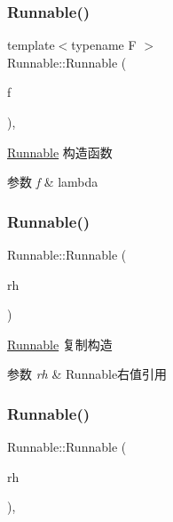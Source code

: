 \subsubsection{\texorpdfstring{Runnable()}{Runnable()}\hspace{0.1cm}{\footnotesize\ttfamily [1/3]}}
{\footnotesize\ttfamily template$<$typename F $>$ \\
Runnable\+::\+Runnable (\begin{DoxyParamCaption}\item[{F \&\&}]{f }\end{DoxyParamCaption})\hspace{0.3cm}{\ttfamily [inline]}, {\ttfamily [explicit]}}



\hyperlink{classRunnable}{Runnable} 构造函数 


\begin{DoxyParams}{参数}
{\em f} & lambda \\
\hline
\end{DoxyParams}
\mbox{\label{classRunnable_a6d6ce997a7873530a2f339412e6c4935}} 
\subsubsection{\texorpdfstring{Runnable()}{Runnable()}\hspace{0.1cm}{\footnotesize\ttfamily [2/3]}}
{\footnotesize\ttfamily Runnable\+::\+Runnable (\begin{DoxyParamCaption}\item[{\hyperlink{classRunnable}{Runnable} \&\&}]{rh }\end{DoxyParamCaption})\hspace{0.3cm}{\ttfamily [inline]}}



\hyperlink{classRunnable}{Runnable} 复制构造 


\begin{DoxyParams}{参数}
{\em rh} & Runnable右值引用 \\
\hline
\end{DoxyParams}
\mbox{\label{classRunnable_a9e4d88b5d30d6e0368c5d22a0df203ee}} 
\subsubsection{\texorpdfstring{Runnable()}{Runnable()}\hspace{0.1cm}{\footnotesize\ttfamily [3/3]}}
{\footnotesize\ttfamily Runnable\+::\+Runnable (\begin{DoxyParamCaption}\item[{\hyperlink{classRunnable}{Runnable} \&}]{rh }\end{DoxyParamCaption})\hspace{0.3cm}{\ttfamily [inline]}, {\ttfamily [explicit]}}



